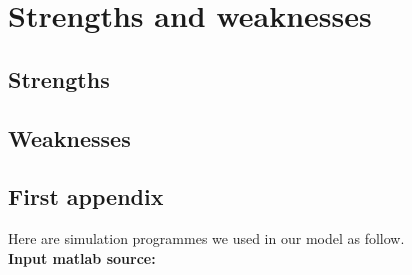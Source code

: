 \documentclass{mcmthesis}
\begin{document}
\section{Strengths and weaknesses}

\subsection{Strengths}

\subsection{Weaknesses}

\newpage




\begin{appendices}

\section{First appendix}

Here are simulation programmes we used in our model as follow.\\

\textbf{\textcolor[rgb]{0.98,0.00,0.00}{Input matlab source:}}



% 

\end{appendices}
\end{document}
